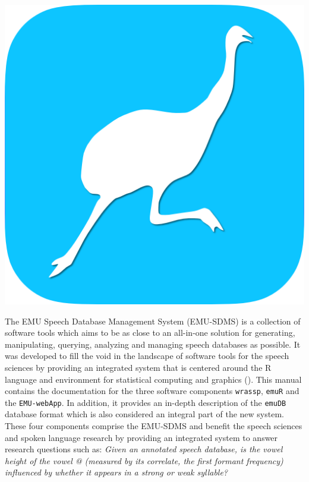 \documentclass[]{book}
\begin{document}
\begin{center}\includegraphics[width=0.35\linewidth]{pics/EMU-webAppIcon-roundCorners} \end{center}

The EMU Speech Database Management System (EMU-SDMS) is a collection of software tools which aims to be as close to an all-in-one solution for generating, manipulating, querying, analyzing and managing speech databases as possible. It was developed to fill the void in the landscape of software tools for the speech sciences by providing an integrated system that is centered around the R language and environment for statistical computing and graphics (\citet{r-core-team:2016a}). This manual contains the documentation for the three software components \texttt{wrassp}, \texttt{emuR} and the \texttt{EMU-webApp}. In addition, it provides an in-depth description of the \texttt{emuDB} database format which is also considered an integral part of the new system. These four components comprise the EMU-SDMS and benefit the speech sciences and spoken language research by providing an integrated system to answer research questions such as: \emph{Given an annotated speech database, is the vowel height of the vowel @ (measured by its correlate, the first formant frequency) influenced by whether it appears in a strong or weak syllable?}
\end{document}
